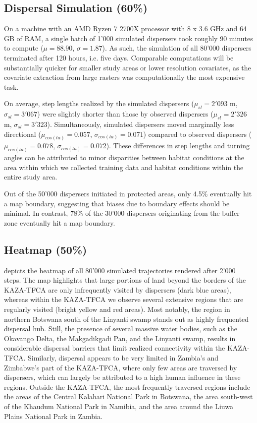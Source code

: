 \documentclass[abstract=on,10pt,a4paper,bibliography=totocnumbered]{article}
\begin{document}
\subsection{Dispersal Simulation (60\%)}
On a machine with an AMD Ryzen 7 2700X processor with 8 x 3.6 GHz and 64 GB of
RAM, a single batch of 1'000 simulated dispersers took roughly 90 minutes to
compute (\(\mu = 88.90\), \(\sigma = 1.87\)). As such, the simulation of all
80'000 dispersers terminated after 120 hours, i.e. five days. Comparable
computations will be substantially quicker for smaller study areas or lower
resolution covariates, as the covariate extraction from large rasters was
computationally the most expensive task.

On average, step lengths realized by the simulated dispersers (\(\mu_{sl} =
2'093\) m, \(\sigma_{sl} = 3'067\)) were slightly shorter than those by observed
dispersers (\(\mu_{sl} = 2'326\) m, \(\sigma_{sl} = 3'323\)). Simultaneously,
simulated dispersers moved marginally less directional (\(\mu_{cos(ta)} =
0.057\), \(\sigma_{cos(ta)} = 0.071\)) compared to observed dispersers
(\(\mu_{cos(ta)} = 0.078\), \(\sigma_{cos(ta)} = 0.072\)). These differences in
step lengths and turning angles can be attributed to minor disparities between
habitat conditions at the area within which we collected training data and
habitat conditions within the entire study area.

Out of the 50'000 dispersers initiated in protected areas, only 4.5\% eventually
hit a map boundary, suggesting that biases due to boundary effects should be
minimal. In contrast, 78\% of the 30'000 dispersers originating from the buffer
zone eventually hit a map boundary.

\subsection{Heatmap (50\%)}
 depicts the heatmap of all 80'000 simulated trajectories rendered
after 2'000 steps. The map highlights that large portions of land beyond the
borders of the KAZA-TFCA are only infrequently visited by dispersers (dark blue
areas), whereas within the KAZA-TFCA we observe several extensive regions that
are regularly visited (bright yellow and red areas). Most notably, the region in
northern Botswana south of the Linyanti swamp stands out as highly frequented
dispersal hub. Still, the presence of several massive water bodies, such as the
Okavango Delta, the Makgadikgadi Pan, and the Linyanti swamp, results in
considerable dispersal barriers that limit realized connectivity within the
KAZA-TFCA. Similarly, dispersal appears to be very limited in Zambia's and
Zimbabwe's part of the KAZA-TFCA, where only few areas are traversed by
dispersers, which can largely be attributed to a high human influence in these
regions. Outside the KAZA-TFCA, the most frequently traversed regions include
the areas of the Central Kalahari National Park in Botswana, the area south-west
of the Khaudum National Park in Namibia, and the area around the Liuwa Plains
National Park in Zambia.
\end{document}
